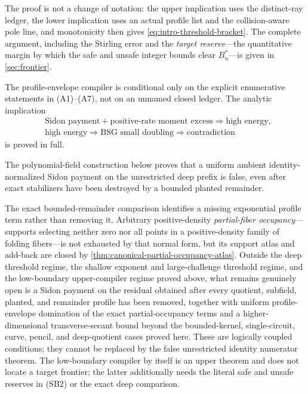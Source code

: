 \documentclass[12pt,a4paper]{amsart}
\numberwithin{equation}{section}
\theoremstyle{remark}
\begin{document}
The proof is not a change of notation: the upper implication uses the
distinct-ray ledger, the lower implication uses an actual profile list and
the collision-aware pole line, and monotonicity then gives
\eqref{eq:intro-threshold-bracket}.  The complete argument, including the
Stirling error and the \emph{target reserve}---the quantitative margin by
which the safe and unsafe integer bounds clear \(B_n^*\)---is given in
\cref{sec:frontier}.

The profile-envelope compiler is conditional only on the explicit
enumerative statements in \textup{(A1)}--\textup{(A7)}, not on an unnamed
closed ledger.  The analytic implication
\[
 \begin{aligned}
 &\text{Sidon payment}+\text{positive-rate moment excess}
   \Longrightarrow\text{high energy},\\
 &\text{high energy}\Longrightarrow\text{BSG small doubling}
   \Longrightarrow\text{contradiction}
 \end{aligned}
\]
is proved in full.

The polynomial-field construction below proves that a
uniform ambient identity-normalized Sidon payment on the unrestricted deep
prefix is false, even after
exact stabilizers have been destroyed by a bounded planted remainder.

The exact bounded-remainder comparison identifies a missing exponential
profile term rather than removing it.  Arbitrary positive-density
\emph{partial-fiber occupancy}---supports selecting neither zero nor all
points in a positive-density family of folding fibers---is not exhausted
by that normal form, but its support atlas and add-back are closed by
\cref{thm:canonical-partial-occupancy-atlas}.  Outside the deep threshold
regime, the shallow exponent and large-challenge threshold regime, and the
low-boundary upper-compiler regime proved above, what
remains genuinely open is a Sidon payment on the residual obtained
after every quotient, subfield, planted, and remainder profile has been
removed, together with uniform profile-envelope domination of the exact
partial-occupancy terms and a higher-dimensional transverse-secant bound
beyond the bounded-kernel, single-circuit, curve, pencil, and deep-quotient
cases proved here.  These are logically coupled conditions; they cannot
be replaced by the false unrestricted identity numerator theorem.
The low-boundary compiler by itself is an upper theorem and does not
locate a target frontier; the latter additionally needs the literal safe
and unsafe reserves in \textup{(SB2)} or the exact deep comparison.
\end{document}
